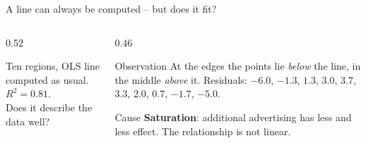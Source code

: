 \documentclass[aspectratio=169,11pt]{beamer}
\def\saturlist{1/25,2/32,3/37,4/41,5/44,6/46,7/47,8/48,9/48,10/47}
\newcommand{\saturpoints}{\addplot[only marks, mark=*, mark size=2.2pt, color=hsbiblau]
  coordinates {(1,25) (2,32) (3,37) (4,41) (5,44) (6,46) (7,47) (8,48) (9,48) (10,47)};}
\newcommand{\residualsof}[4]{%
  \foreach \px/\py in #1 {%
    \pgfmathsetmacro{\yh}{#2 + #3*\px}%
    \edef\tmpdraw{\noexpand\draw[#4] (axis cs:\px,\py) -- (axis cs:\px,\yh);}%
    \tmpdraw
  }}
\begin{document}
\begin{frame}{A line can always be computed -- but does it fit?}
  \begin{columns}[T]
    \begin{column}{0.52\textwidth}
      \begin{center}\footnotesize
        Ten regions, OLS line computed as usual. $R^2=0.81$.\\
        Does it describe the data well?
      \end{center}
    \end{column}
    \begin{column}{0.46\textwidth}
      \small
      \begin{alertblock}{Observation}
        At the edges the points lie \emph{below} the line, in the middle
        \emph{above} it. Residuals: $-6.0$, $-1.3$, $1.3$, $3.0$, $3.7$,
        $3.3$, $2.0$, $0.7$, $-1.7$, $-5.0$.
      \end{alertblock}
      \begin{block}{Cause}
        \textbf{Saturation}: additional advertising has less and less effect.
        The relationship is not linear.
      \end{block}
    \end{column}
  \end{columns}
\end{frame}
\end{document}
